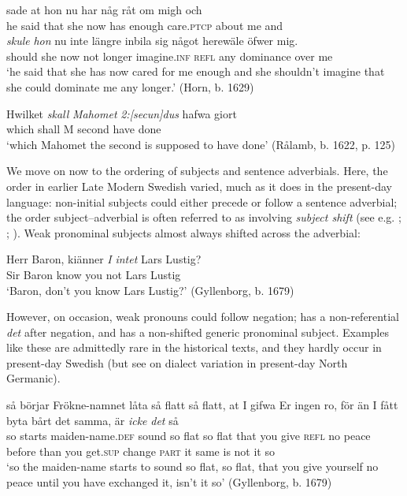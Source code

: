 \documentclass[output=paper]{langscibook}
\begin{document}
\ea\label{ex:intro:12}
\ea\label{ex:intro:12a}
\gll  [han] sade at     hon   nu   har     någ    råt     om   migh och \\
he   said   that she   now has   enough   care.\textsc{ptcp}   about   me     and\\

\gll  \textit{skule}   \textit{hon} nu   inte längre inbila       sig   något herewäle  öfwer   mig.\\
    should   she   now   not longer   imagine.\textsc{inf}   \textsc{refl}   any   dominance   over   me \\
\glt `he said that she has now cared for me enough and she shouldn’t imagine that she could dominate me any longer.’ (Horn, b. 1629)

\ex\label{ex:intro:12b}
\gll  Hwilket \textit{skall}   \textit{Mahomet} \textit{2:[secun]dus} hafwa   giort \\
      which   shall   M         second       have       done\\
    \glt ‘which Mahomet the second is supposed to have done’ (Rålamb, b. 1622, p. 125)
\z
\z

We move on now to the ordering of subjects and sentence adverbials. Here, the order in earlier Late Modern Swedish varied, much as it does in the present-day language: non-initial subjects could either precede or follow a sentence adverbial; the order subject–adverbial is often referred to as involving \textit{subject shift} (see e.g. \citealt{Holmberg1993}; \citealt{Svenonius2002}; \citealt{Andreasson2007}). Weak pronominal subjects almost always shifted across the adverbial:


\ea\label{ex:intro:13}
\gll  Herr Baron,   kiänner \textit{I} \textit{intet} Lars Lustig? \\
Sir      Baron  know    you not     Lars Lustig\\
\glt ‘Baron, don’t you know Lars Lustig?’ (Gyllenborg, b. 1679)
\z


However, on occasion, weak pronouns could follow negation;  has a non-referential \textit{det} after negation, and  has a non-shifted generic pronominal subject. Examples like these are admittedly rare in the historical texts, and they hardly occur in present-day Swedish (but see \citealt{Bentzen2014} on dialect variation in present-day North Germanic).


\ea\label{ex:intro:14}
\ea\label{ex:intro:14a}
\gll  så börjar   Frökne-namnet     låta       så flatt så flatt,   at   I     gifwa   Er ingen ro,     för     än   I       fått       byta     bårt det samma, är \textit{icke} \textit{det} så\\
  so starts   maiden-name.\textsc{def}    sound   so flat   so flat   that you   give   \textsc{refl} no       peace   before than you   get\textsc{.sup} change \textsc{part}   it same is   not     it     so\\
\glt ‘so the maiden-name starts to sound so flat, so flat, that you give yourself no peace until you have exchanged it, isn’t it so’ (Gyllenborg, b. 1679)
\end{document}
